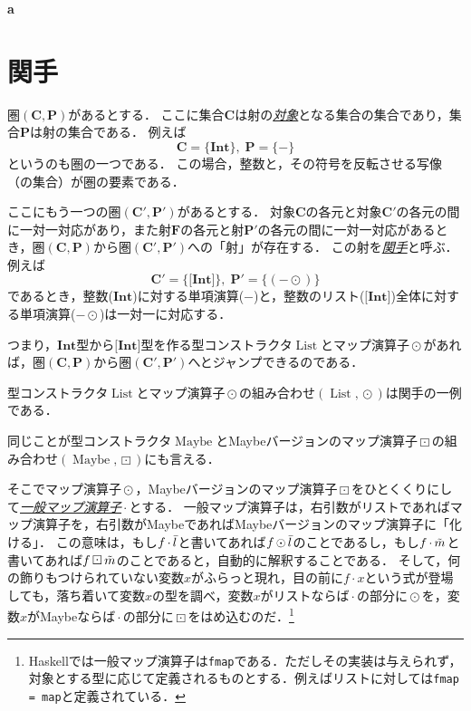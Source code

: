 \documentclass[twocolumn]{jsbook}
\newcommand{\keyword}[1]{\underline{\emph{#1}}}
\newcommand{\code}[1]{\texttt{#1}}
\newenvironment{leader}{\begingroup\bf}{\endgroup}
\newcommand{\hsklType}[1]{\textbf{#1}}
\newcommand{\hsklTypeConstructor}[1]{\mathop{\mathrm{#1}}}
\DeclareMathOperator{\hsklFmap}{\cdot}
\DeclareMathOperator{\hsklListConstructor}{\hsklTypeConstructor{List}}
\DeclareMathOperator{\hsklMap}{\odot}
\DeclareMathOperator{\hsklMaybeConstructor}{\hsklTypeConstructor{Maybe}}
\DeclareMathOperator{\hsklMaybeMap}{\boxdot}
\newcommand{\hsklInt}{\hsklType{Int}}
\newcommand{\hsklList}[1]{\Bar{#1}}
\newcommand{\hsklListType}[1]{\boldsymbol{[}#1\boldsymbol{]}}
\newcommand{\hsklMaybe}[1]{\Tilde{#1}}
\newcommand{\mathSet}[1]{\mathbf{#1}}
\newcommand{\mathCategoryShort}[2]{(#1,#2)}
\begin{document}
\begin{leader}
a
\end{leader}


\section{関手}

圏$\mathCategoryShort{\mathSet{C}}{\mathSet{P}}$があるとする．
ここに集合$\mathSet{C}$は射の\keyword{対象}となる集合の集合であり，集合$\mathSet{P}$は射の集合である．
例えば$$\mathSet{C}=\{\hsklInt\},\;\mathSet{P}=\{-\}$$というのも圏の一つである．
この場合，整数と，その符号を反転させる写像（の集合）が圏の要素である．

ここにもう一つの圏$\mathCategoryShort{\mathSet{C}'}{\mathSet{P}'}$があるとする．
対象$\mathSet{C}$の各元と対象$\mathSet{C}'$の各元の間に一対一対応があり，また射$\mathSet{F}$の各元と射$\mathSet{P}'$の各元の間に一対一対応があるとき，圏$\mathCategoryShort{\mathSet{C}}{\mathSet{P}}$から圏$\mathCategoryShort{\mathSet{C}'}{\mathSet{P}'}$への「射」が存在する．
この射を\keyword{関手}と呼ぶ．
例えば$$\mathSet{C}'=\{\hsklListType{\hsklInt}\},\;\mathSet{P}'=\{(-\hsklMap)\}$$であるとき，整数($\hsklInt$)に対する単項演算($-$)と，整数のリスト($\hsklListType{\hsklInt}$)全体に対する単項演算($-\hsklMap$)は一対一に対応する．

つまり，$\hsklInt$型から$\hsklListType{\hsklInt}$型を作る型コンストラクタ$\hsklListConstructor$とマップ演算子$\hsklMap$があれば，圏$\mathCategoryShort{\mathSet{C}}{\mathSet{P}}$から圏$\mathCategoryShort{\mathSet{C}'}{\mathSet{P}'}$へとジャンプできるのである．

型コンストラクタ$\hsklListConstructor$とマップ演算子$\hsklMap$の組み合わせ$(\hsklListConstructor,\hsklMap)$は関手の一例である．

同じことが型コンストラクタ$\hsklMaybeConstructor$とMaybeバージョンのマップ演算子$\hsklMaybeMap$の組み合わせ$(\hsklMaybeConstructor,\hsklMaybeMap)$にも言える．

そこでマップ演算子$\hsklMap$，Maybeバージョンのマップ演算子$\hsklMaybeMap$をひとくくりにして\keyword{一般マップ演算子}$\hsklFmap$とする．
一般マップ演算子は，右引数がリストであればマップ演算子を，右引数がMaybeであればMaybeバージョンのマップ演算子に「化ける」．
この意味は，もし$f\hsklFmap\hsklList{l}$と書いてあれば$f\hsklMap\hsklList{l}$のことであるし，もし$f\hsklFmap\hsklMaybe{m}$と書いてあれば$f\hsklMaybeMap\hsklMaybe{m}$のことであると，自動的に解釈することである．
そして，何の飾りもつけられていない変数$x$がふらっと現れ，目の前に$f\hsklFmap x$という式が登場しても，落ち着いて変数$x$の型を調べ，変数$x$がリストならば$\hsklFmap$の部分に$\hsklMap$を，変数$x$がMaybeならば$\hsklFmap$の部分に$\hsklMaybeMap$をはめ込むのだ．\footnote{Haskellでは一般マップ演算子は\code{fmap}である．ただしその実装は与えられず，対象とする型に応じて定義されるものとする．例えばリストに対しては\code{fmap = map}と定義されている．}
\end{document}
